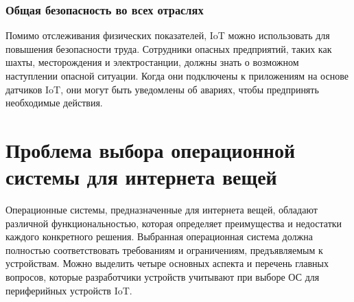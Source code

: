 \subsubsection{Общая безопасность во всех отраслях}

Помимо отслеживания физических показателей, IoT можно использовать для повышения безопасности труда. Сотрудники опасных предприятий, таких как шахты, месторождения и электростанции, должны знать о возможном наступлении опасной ситуации. Когда они подключены к приложениям на основе датчиков IoT, они могут быть уведомлены об авариях, чтобы предпринять необходимые действия.



\section{Проблема выбора операционной системы для интернета вещей}

Операционные системы, предназначенные для интернета вещей, обладают различной функциональностью, которая определяет преимущества и недостатки каждого конкретного решения. Выбранная операционная система должна полностью соответствовать требованиям и ограничениям, предъявляемым к устройствам. Можно выделить четыре основных аспекта и перечень главных вопросов, которые разработчики устройств учитывают при выборе ОС для периферийных устройств IoT. \cite{OS_questions}



